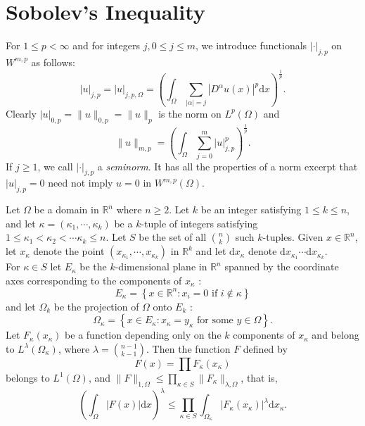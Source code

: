 \section{Sobolev's Inequality}
\begin{definition}[Seminorms]
For $1\le p<\infty$ and for integers $j,0\le j\le m$, we introduce functionals $\left| \cdot  \right| _{j,p}$ on $W^{m,p}$ as follows:
\[
  \left| u \right| _{j,p}=\left| u \right| _{j,p,\Omega}=\left( \int_{\Omega}\sum_{\left| \alpha \right| =j} \left| D^{\alpha}u(x) \right| ^{p}\mathrm{d}x \right) ^{\frac{1}{p}}
  .
\] 
Clearly $\left| u \right| _{0,p}=\|u\|_{0,p}=\|u\|_{p}$ is the norm on $L^{p}\left( \Omega \right) $ and
\[
  \|u\|_{m,p}=\left( \int_{\Omega}\sum_{j=0}^{m} \left| u \right| _{j,p}^{p} \right) ^{\frac{1}{p}}
  .
\] 
If $j\ge 1$, we call $\left| \cdot  \right| _{j,p}$ a {\itshape seminorm}. It has all the properties of a norm excerpt that $\left| u \right| _{j,p}=0$ need not imply $u=0$ in $W^{m,p}\left( \Omega \right) $.
\end{definition}
\begin{lemma}
Let $\Omega$ be a domain in $\mathbb{R}^{n}$ where $n\ge 2$. Let $k$ be an integer satisfying $1\le k\le n$, and let $\kappa=\left( \kappa_1,\cdots,\kappa_k \right) $ be a $k$-tuple of integers satisfying $1\le \kappa_1<\kappa_2<\cdots\kappa_k\le n$. Let $S$ be the set of all $\binom{n}{k}$ such $k$-tuples. Given $x\in \mathbb{R}^{n}$, let $x_\kappa$ denote the point $\left( x_{\kappa_1},\cdots,x_{\kappa_k} \right) $ in $\mathbb{R}^{k}$ and let $\mathrm{d}x_{\kappa}$ denote $\mathrm{d}x_{\kappa_1}\cdots\mathrm{d}x_{\kappa_k}$.\\
  For $\kappa \in S$ let $E_{\kappa}$ be the $k$-dimensional plane in $\mathbb{R}^{n}$ spanned by the coordinate axes corresponding to the components of $x_{\kappa}$ :
  \[
    E_{\kappa}=\left\{ x\in \mathbb{R}^{n}: x_{i}=0 \text{ if }i\not\in \kappa \right\} 
  \] 
  and let $\Omega_k$ be the projection of $\Omega$ onto $E_k$ :
  \[
  \Omega_{\kappa}=\left\{ x\in E_{\kappa}:x_{\kappa}=y_{\kappa}\text{ for some }y\in \Omega \right\} .
  \]
  Let $F_{\kappa}(x_{\kappa})$ be a function depending only on the $k$ components of $x_{\kappa} $ and belong to $L^{\lambda}\left( \Omega_{\kappa} \right) $, where $\lambda = \binom{n-1}{k-1}$. Then the function  $F$ defined by
  \[
    F(x)=\prod F_{\kappa}(x_{\kappa})
  \] 
  belongs to $L^{1}\left( \Omega \right) $, and $\|F\|_{1,\Omega}\le \prod_{\kappa \in S}\|F_{\kappa}\|_{\lambda,\Omega}$, that is,
  \[
    \left( \int_{\Omega}\left| F(x) \right| \mathrm{d}x \right) ^{\lambda}\le \prod_{\kappa \in  S}\int_{\Omega_\kappa}\left| F_{\kappa}\left( x_{\kappa} \right)  \right| ^{\lambda}\mathrm{d}x_{\kappa}.
  \] 
\end{lemma}
